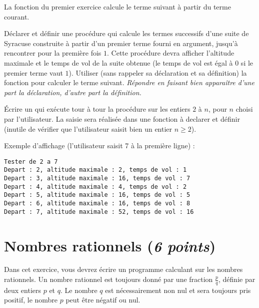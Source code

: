 La fonction  du premier exercice calcule le terme
suivant à partir du terme courant.

\begin{newenu}
\item Déclarer et définir une procédure  qui calcule les
  termes successifs d'une suite de Syracuse construite à partir d'un
  premier terme fourni en argument, jusqu'à rencontrer pour la
  première fois $1$. Cette procédure devra afficher l'altitude maximale
  et le temps de vol de la suite obtenue (le temps de vol est égal à
  $0$ si le premier terme vaut $1$). Utiliser (sans rappeler sa
  déclaration et sa définition) la fonction  pour
  calculer le terme suivant. \emph{Répondre en faisant bien apparaître
    d'une part la déclaration, d'autre part la définition.}
\item Écrire un  qui exécute tour à tour la procédure
   sur les entiers $2$ à $n$, pour $n$ choisi par
  l'utilisateur. La saisie sera réalisée dans une fonction à declarer
  et définir (inutile de vérifier que l'utilisateur saisit bien un
  entier $n \geq 2$).
\end{newenu}

Exemple d'affichage (l'utilisateur saisit 7 à la première ligne) :
\begin{verbatim}
Tester de 2 a 7
Depart : 2, altitude maximale : 2, temps de vol : 1
Depart : 3, altitude maximale : 16, temps de vol : 7
Depart : 4, altitude maximale : 4, temps de vol : 2
Depart : 5, altitude maximale : 16, temps de vol : 5
Depart : 6, altitude maximale : 16, temps de vol : 8
Depart : 7, altitude maximale : 52, temps de vol : 16
\end{verbatim}


\section{Nombres rationnels (\emph{6 points})}

Dans cet exercice, vous devrez écrire un programme calculant sur les
nombres rationnels. Un nombre rationnel est toujours donné par une
fraction $\frac{p}{q}$, définie par deux entiers $p$ et $q$. Le nombre
$q$ est nécessairement non nul et sera toujours pris positif, le
nombre $p$ peut être négatif ou nul.

